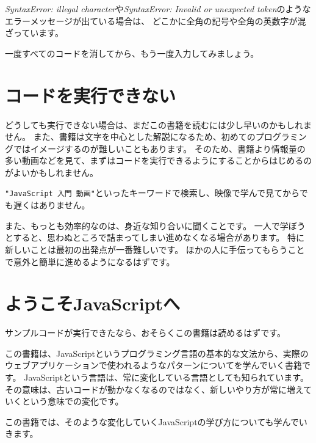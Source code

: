 \emph{SyntaxError: illegal character}や\emph{SyntaxError: Invalid or
unexpected token}のようなエラーメッセージが出ている場合は、
どこかに全角の記号や全角の英数字が混ざっています。

一度すべてのコードを消してから、もう一度入力してみましょう。

\hypertarget{failure}{%
\section*{コードを実行できない}\label{failure}}

どうしても実行できない場合は、まだこの書籍を読むには少し早いのかもしれません。
また、書籍は文字を中心とした解説になるため、初めてのプログラミングではイメージするのが難しいこともあります。
そのため、書籍より情報量の多い動画などを見て、まずはコードを実行できるようにすることからはじめるのがよいかもしれません。

\texttt{"JavaScript 入門 動画"}といったキーワードで検索し、映像で学んで見てからでも遅くはありません。

また、もっとも効率的なのは、身近な知り合いに聞くことです。
一人で学ぼうとすると、思わぬところで詰まってしまい進めなくなる場合があります。
特に新しいことは最初の出発点が一番難しいです。
ほかの人に手伝ってもらうことで意外と簡単に進めるようになるはずです。

\hypertarget{welcome-to-javascript}{%
\section*{ようこそJavaScriptへ}\label{welcome-to-javascript}}

サンプルコードが実行できたなら、おそらくこの書籍は読めるはずです。

この書籍は、JavaScriptというプログラミング言語の基本的な文法から、実際のウェブアプリケーションで使われるようなパターンについてを学んでいく書籍です。
JavaScriptという言語は、常に変化している言語としても知られています。
その意味は、古いコードが動かなくなるのではなく、新しいやり方が常に増えていくという意味での変化です。

この書籍では、そのような変化していくJavaScriptの学び方についても学んでいきます。

